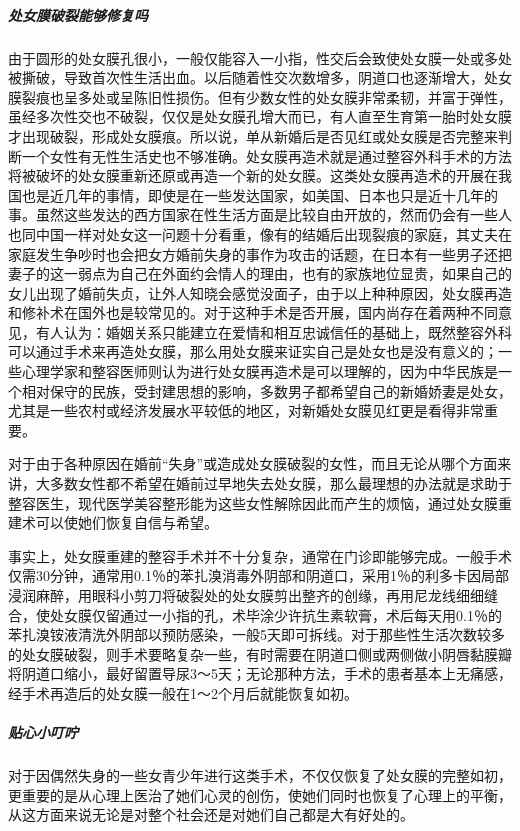 \begin{enumerate}
\subparagraph{处女膜破裂能够修复吗}

由于圆形的处女膜孔很小，一般仅能容入一小指，性交后会致使处女膜一处或多处被撕破，导致首次性生活出血。以后随着性交次数增多，阴道口也逐渐增大，处女膜裂痕也呈多处或呈陈旧性损伤。但有少数女性的处女膜非常柔韧，并富于弹性，虽经多次性交也不破裂，仅仅是处女膜孔增大而已，有人直至生育第一胎时处女膜才出现破裂，形成处女膜痕。所以说，单从新婚后是否见红或处女膜是否完整来判断一个女性有无性生活史也不够准确。处女膜再造术就是通过整容外科手术的方法将被破坏的处女膜重新还原或再造一个新的处女膜。这类处女膜再造术的开展在我国也是近几年的事情，即使是在一些发达国家，如美国、日本也只是近十几年的事。虽然这些发达的西方国家在性生活方面是比较自由开放的，然而仍会有一些人也同中国一样对处女这一问题十分看重，像有的结婚后出现裂痕的家庭，其丈夫在家庭发生争吵时也会把女方婚前失身的事作为攻击的话题，在日本有一些男子还把妻子的这一弱点为自己在外面约会情人的理由，也有的家族地位显贵，如果自己的女儿出现了婚前失贞，让外人知晓会感觉没面子，由于以上种种原因，处女膜再造和修补术在国外也是较常见的。对于这种手术是否开展，国内尚存在着两种不同意见，有人认为：婚姻关系只能建立在爱情和相互忠诚信任的基础上，既然整容外科可以通过手术来再造处女膜，那么用处女膜来证实自己是处女也是没有意义的；一些心理学家和整容医师则认为进行处女膜再造术是可以理解的，因为中华民族是一个相对保守的民族，受封建思想的影响，多数男子都希望自己的新婚娇妻是处女，尤其是一些农村或经济发展水平较低的地区，对新婚处女膜见红更是看得非常重要。

对于由于各种原因在婚前“失身”或造成处女膜破裂的女性，而且无论从哪个方面来讲，大多数女性都不希望在婚前过早地失去处女膜，那么最理想的办法就是求助于整容医生，现代医学美容整形能为这些女性解除因此而产生的烦恼，通过处女膜重建术可以使她们恢复自信与希望。

事实上，处女膜重建的整容手术并不十分复杂，通常在门诊即能够完成。一般手术仅需30分钟，通常用0.1％的苯扎溴消毒外阴部和阴道口，采用1％的利多卡因局部浸润麻醉，用眼科小剪刀将破裂处的处女膜剪出整齐的创缘，再用尼龙线细细缝合，使处女膜仅留通过一小指的孔，术毕涂少许抗生素软膏，术后每天用0.1％的苯扎溴铵液清洗外阴部以预防感染，一般5天即可拆线。对于那些性生活次数较多的处女膜破裂，则手术要略复杂一些，有时需要在阴道口侧或两侧做小阴唇黏膜瓣将阴道口缩小，最好留置导尿3～5天；无论那种方法，手术的患者基本上无痛感，经手术再造后的处女膜一般在1～2个月后就能恢复如初。

\subparagraph{贴心小叮咛}

对于因偶然失身的一些女青少年进行这类手术，不仅仅恢复了处女膜的完整如初，更重要的是从心理上医治了她们心灵的创伤，使她们同时也恢复了心理上的平衡，从这方面来说无论是对整个社会还是对她们自己都是大有好处的。


\end{enumerate}
